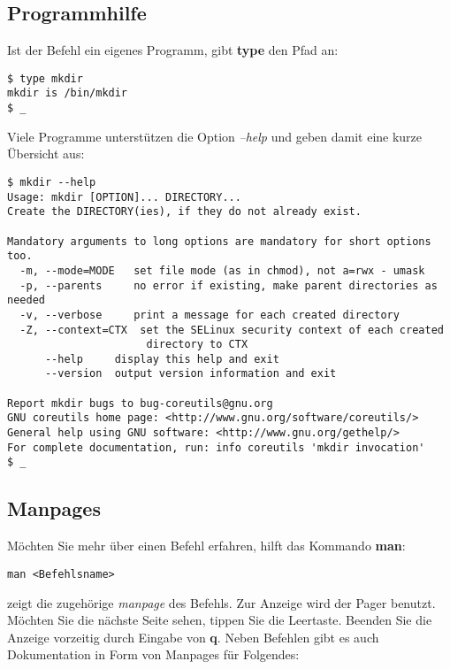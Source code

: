 \documentclass[titlepage,a4paper]{article}
\begin{document}
\subsection{Programmhilfe}

Ist der Befehl ein eigenes Programm, gibt \textbf{type} den Pfad an:

\begin{verbatim}
$ type mkdir
mkdir is /bin/mkdir
$ _
\end{verbatim}

Viele Programme unterstützen die Option \emph{--help} und geben damit
eine kurze Übersicht aus:

\begin{verbatim}
$ mkdir --help
Usage: mkdir [OPTION]... DIRECTORY...
Create the DIRECTORY(ies), if they do not already exist.

Mandatory arguments to long options are mandatory for short options too.
  -m, --mode=MODE   set file mode (as in chmod), not a=rwx - umask
  -p, --parents     no error if existing, make parent directories as needed
  -v, --verbose     print a message for each created directory
  -Z, --context=CTX  set the SELinux security context of each created
                      directory to CTX
      --help     display this help and exit
      --version  output version information and exit

Report mkdir bugs to bug-coreutils@gnu.org
GNU coreutils home page: <http://www.gnu.org/software/coreutils/>
General help using GNU software: <http://www.gnu.org/gethelp/>
For complete documentation, run: info coreutils 'mkdir invocation'
$ _
\end{verbatim}

\subsection{Manpages}

Möchten Sie mehr über einen Befehl erfahren, hilft das Kommando \textbf{man}:

\begin{verbatim}
man <Befehlsname>
\end{verbatim}

zeigt die zugehörige \emph{manpage} des Befehls.  Zur Anzeige wird der Pager
benutzt.  Möchten Sie die nächste Seite sehen, tippen Sie die Leertaste.
Beenden Sie die Anzeige vorzeitig durch Eingabe von \textbf{q}.  Neben
Befehlen gibt es auch Dokumentation in Form von Manpages für Folgendes:
\end{document}
